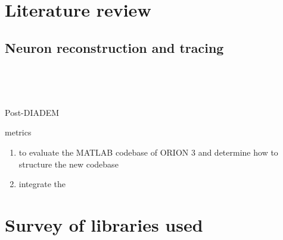 \section{Literature review}

\subsection{Neuron reconstruction and tracing}\label{subsec:neuron-tracing}

~\autocite{Duke-Southampton-archive:Cannon:1998,DIADEM-dataset:Brown:2011}

~\autocite{DIADEM&Beyond:Liu:2011,NeuroMorphTrends:Halavi:2012,NeuroTracePerspect:Meijering:2010}

Post-DIADEM
~\autocite{Bauer2010,MIA-anisotropic-path-searching-Xie2011,MICCAI-anisotropic-path-searching-Xie2010,
Jeong2015,Luo2015,De2015,Gulyanon2015,ORION_Santamaria-Pang2015,Mukherjee2014,Hernandez-Herrera2014,Basu2014,Xiao2013,Jimenez2013,Basu2013,Mukherjee2013,Hernandez-Herrera2013,Ming2013,Lee2012,Czarnecki2012}

metrics~\autocite{Mayerich2011,Mayerich2012,btmorph-Torben-Nielsen2014,Costa2014,Gillette2015}

\begin{enumerate}[label=(\roman*)]
\item to evaluate the MATLAB codebase of ORION 3 and determine how to structure the new codebase
\item integrate the
\end{enumerate}

%

\section{Survey of libraries used}


